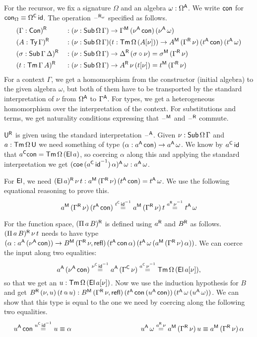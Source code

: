 \documentclass[acmsmall,review,anonymous]{acmart}\settopmatter{printfolios=true,printccs=false,printacmref=false}
\begin{document}
For the recursor, we fix a signature $\Omega$ and an algebra
$\omega:\Omega^{\mathsf{A}}$. We write $\mathsf{con}$ for $\mathsf{con}_\Omega \equiv
\Omega^{\mathsf{C}}\,\mathsf{id}$. The operation $\mathord{\hspace{1pt}\text{--}\hspace{1pt}}^{\mathsf{R}_\omega}$ specified as
follows.
\begin{alignat*}{5}
  & (\Gamma:\mathsf{Con})^{\mathsf{R}} && : (\nu:\mathsf{Sub}\,\Omega\,\Gamma)\rightarrow\Gamma^{\mathsf{M}}\,(\nu^{\mathsf{A}}\,\mathsf{con})\,(\nu^{\mathsf{A}}\,\omega) \\
  & (A:\mathsf{Ty}\,\Gamma)^{\mathsf{R}} && : (\nu:\mathsf{Sub}\,\Omega\,\Gamma)(t:\mathsf{Tm}\,\Omega\,(A[\nu]))\rightarrow A^{\mathsf{M}}\,(\Gamma^{\mathsf{R}}\,\nu)\,(t^{\mathsf{A}}\,\mathsf{con})\,(t^{\mathsf{A}}\,\omega) \\
  & (\sigma:\mathsf{Sub}\,\Gamma\,\Delta)^{\mathsf{R}} && : (\nu:\mathsf{Sub}\,\Omega\,\Gamma)\rightarrow \Delta^{\mathsf{R}}\,(\sigma\circ\nu)=\sigma^{\mathsf{M}}\,(\Gamma^{\mathsf{R}}\,\nu) \\
  & (t:\mathsf{Tm}\,\Gamma\,A)^{\mathsf{R}} && : (\nu:\mathsf{Sub}\,\Omega\,\Gamma)\rightarrow A^{\mathsf{R}}\,\nu\,(t[\nu])=t^{\mathsf{M}}\,(\Gamma^{\mathsf{R}}\,\nu)
\end{alignat*}
For a context $\Gamma$, we get a homomorphism from the constructor
(initial algebra) to the given algebra $\omega$, but both of them have
to be transported by the standard interpretation of $\nu$ from
$\Omega^{\mathsf{A}}$ to $\Gamma^{\mathsf{A}}$. For types, we get a heterogeneous
homomorphism over the interpretation of the context. For substitutions
and terms, we get naturality conditions expressing that $\mathord{\hspace{1pt}\text{--}\hspace{1pt}}^{\mathsf{M}}$
and $\mathord{\hspace{1pt}\text{--}\hspace{1pt}}^{\mathsf{R}}$ commute.

$\mathsf{U}^{\mathsf{R}}$ is given using the standard interpretation $\mathord{\hspace{1pt}\text{--}\hspace{1pt}}^{\mathsf{A}}$. Given
$\nu:\mathsf{Sub}\,\Omega\,\Gamma$ and $a:\mathsf{Tm}\,\Omega\,\mathsf{U}$ we need something
of type $(\alpha:a^{\mathsf{A}}\,\mathsf{con})\rightarrow a^{\mathsf{A}}\,\omega$. We know by $a^{\mathsf{C}}\,\mathsf{id}$
that $a^{\mathsf{C}}\mathsf{con} = \mathsf{Tm}\,\Omega\,(\mathsf{El}\,a)$, so coercing $\alpha$ along
this and applying the standard interpretation we get
$(\mathsf{coe}\,({a^{\mathsf{C}}\,\mathsf{id}}^{-1})\,\alpha)^{\mathsf{A}}\,\omega : a^{\mathsf{A}}\,\omega$.

For $\mathsf{El}$, we need $(\mathsf{El}\,a)^{\mathsf{R}}\,\nu\,t :
a^{\mathsf{M}}\,(\Gamma^{\mathsf{R}}\,\nu)\,(t^{\mathsf{A}}\,\mathsf{con}) = t^{\mathsf{A}}\,\omega$. We use the
following equational reasoning to prove this.
\[
a^{\mathsf{M}}\,(\Gamma^{\mathsf{R}}\,\nu)\,(t^{\mathsf{A}}\,\mathsf{con}) \overset{{t^{\mathsf{C}}\,\mathsf{id}}^{-1}}{=} a^{\mathsf{M}}\,(\Gamma^{\mathsf{R}}\,\nu)\,t \overset{{a^{\mathsf{R}}\,\nu}^{-1}}{=} t^{\mathsf{A}}\,\omega
\]

For the function space, $(\Pi\,a\,B)^{\mathsf{R}}$ is defined using $a^{\mathsf{R}}$ and
$B^{\mathsf{R}}$ as follows. $(\Pi\,a\,B)^{\mathsf{R}}\,\nu\,t$ needs to have type
$(\alpha:a^{\mathsf{A}}\,(\nu^{\mathsf{A}}\,\mathsf{con}))\rightarrow
B^{\mathsf{M}}\,(\Gamma^{\mathsf{R}}\,\nu,\mathsf{refl})\,(t^{\mathsf{A}}\,\mathsf{con}\,\alpha)\,(t^{\mathsf{A}}\,\omega\,(a^{\mathsf{M}}\,(\Gamma^{\mathsf{R}}\,\nu)\,\alpha))$. We
can coerce the input along two equalities:
\[
a^{\mathsf{A}}\,(\nu^{\mathsf{A}}\,\mathsf{con}) \overset{{\nu^{\mathsf{C}}\,\mathsf{id}}^{-1}}{=} a^{\mathsf{A}}\,(\Gamma^{\mathsf{C}}\,\nu) \overset{{a^{\mathsf{C}}\,\nu}^{-1}}{=} \mathsf{Tm}\,\Omega\,(\mathsf{El}\,a[\nu]),
\]
so that we get an $u : \mathsf{Tm}\,\Omega\,(\mathsf{El}\,a[\nu])$. Now we use the
induction hypothesis for $B$ and get $B^{\mathsf{R}}\,(\nu,u)\,(t\mathop{{\scriptstyle @}} u) :
B^{\mathsf{M}}\,(\Gamma^{\mathsf{R}}\,\nu,
\mathsf{refl})\,(t^{\mathsf{A}}\,\mathsf{con}\,(u^{\mathsf{A}}\,\mathsf{con}))\,(t^{\mathsf{A}}\,\omega\,(u^{\mathsf{A}}\,\omega))$. We
can show that this type is equal to the one we need by coercing along
the following two equalities.
\[
u^\A\,\con \overset{{u^\C\,\id}^{-1}}{=} u \equiv \alpha \hspace{10em} u^\A\,\omega \overset{a^\R\,\nu}{=} a^\M\,(\Gamma^\R\,\nu)\,u \equiv a^\M\,(\Gamma^\R\,\nu)\,\alpha
\]
\end{document}
